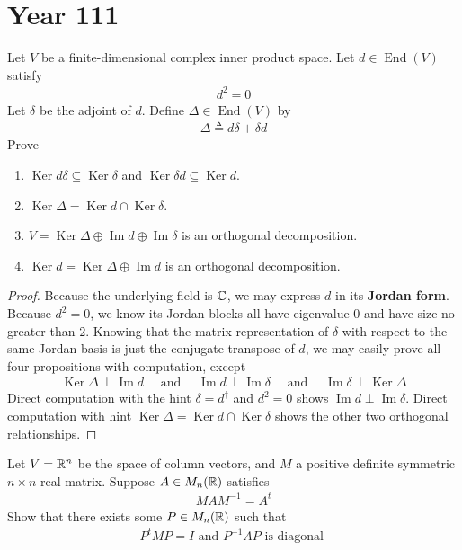\documentclass{report}
\begin{document}
\section{Year 111}
\begin{question}{}{}
Let $V$ be a finite-dimensional complex inner product space. Let $d\in \operatorname{End}(V)$ satisfy 
\begin{align*}
d^2=0
\end{align*}
Let $\delta$ be the adjoint of $d$. Define $\Delta \in \operatorname{End}(V)$ by 
\begin{align*}
\Delta \triangleq d\delta + \delta d
\end{align*}
Prove 
\begin{enumerate}[label=(\alph*)]
  \item $\operatorname{Ker}d\delta\subseteq \operatorname{Ker}\delta$ and $\operatorname{Ker}\delta d\subseteq \operatorname{Ker}d$.
  \item  $\operatorname{Ker}\Delta = \operatorname{Ker}d\cap \operatorname{Ker}\delta$. 
  \item $V= \operatorname{Ker}\Delta \oplus  \operatorname{Im}d \oplus  \operatorname{Im}\delta$ is an orthogonal decomposition. 
  \item $\operatorname{Ker}d=\operatorname{Ker}\Delta \oplus  \operatorname{Im}d$ is an orthogonal decomposition. 
\end{enumerate}
\end{question}
\begin{proof}
  Because the underlying field is $\mathbb{C}$, we may express $d$ in its \textbf{Jordan form}. Because $d^2=0$, we know its Jordan blocks all have eigenvalue  $0$ and have size no greater than  $2$. Knowing that the matrix representation of $\delta$ with respect to the same Jordan basis is just the conjugate transpose of $d$, we may easily prove all four propositions with computation, except 
\begin{align*}
  \operatorname{Ker}\Delta \perp \operatorname{Im}d\quad\text{ and }\quad \operatorname{Im}d \perp \operatorname{Im}\delta \quad\text{ and }\quad \operatorname{Im}\delta \perp \operatorname{Ker}\Delta 
\end{align*}
Direct computation with the hint $\delta= d^{\dagger }$ and $d^2=0$ shows  $\operatorname{Im}d\perp \operatorname{Im}\delta$. Direct computation with hint $\operatorname{Ker}\Delta =\operatorname{Ker}d\cap \operatorname{Ker}\delta$ shows the other two orthogonal relationships. 
\end{proof}
\begin{question}{}{}
Let $V=\mathbb{R}^n$ be the space of column vectors, and  $M$ a positive definite symmetric  $n\times n$ real matrix. Suppose $A\in M_{n}(\mathbb{R})$ satisfies 
\begin{align*}
MAM^{-1}=A^t
\end{align*}
Show that there exists some $P \in M_n(\mathbb{R})$ such that 
\begin{align*}
P^t M P = I \text{ and }P^{-1}AP\text{ is diagonal }
\end{align*}
\end{question}
\end{document}
